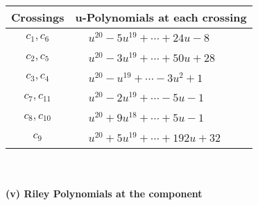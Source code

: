 \documentclass[1p]{elsarticle_modified}
\theoremstyle{definition}
\begin{document}
\begin{tabular}{m{50pt}|m{274pt}}
Crossings & \hspace{64pt}u-Polynomials at each crossing \\
\hline $$\begin{aligned}c_{1},c_{6}\end{aligned}$$&$\begin{aligned}
&u^{20}-5 u^{19}+\cdots+24 u-8
\end{aligned}$\\
\hline $$\begin{aligned}c_{2},c_{5}\end{aligned}$$&$\begin{aligned}
&u^{20}-3 u^{19}+\cdots+50 u+28
\end{aligned}$\\
\hline $$\begin{aligned}c_{3},c_{4}\end{aligned}$$&$\begin{aligned}
&u^{20}- u^{19}+\cdots-3 u^2+1
\end{aligned}$\\
\hline $$\begin{aligned}c_{7},c_{11}\end{aligned}$$&$\begin{aligned}
&u^{20}-2 u^{19}+\cdots-5 u-1
\end{aligned}$\\
\hline $$\begin{aligned}c_{8},c_{10}\end{aligned}$$&$\begin{aligned}
&u^{20}+9 u^{18}+\cdots+5 u-1
\end{aligned}$\\
\hline $$\begin{aligned}c_{9}\end{aligned}$$&$\begin{aligned}
&u^{20}+5 u^{19}+\cdots+192 u+32
\end{aligned}$\\
\hline
\end{tabular}\\~\\
\newpage\renewcommand{\arraystretch}{1}
\flushleft \textbf{(v) Riley Polynomials at the component}\newline \\
\end{document}
